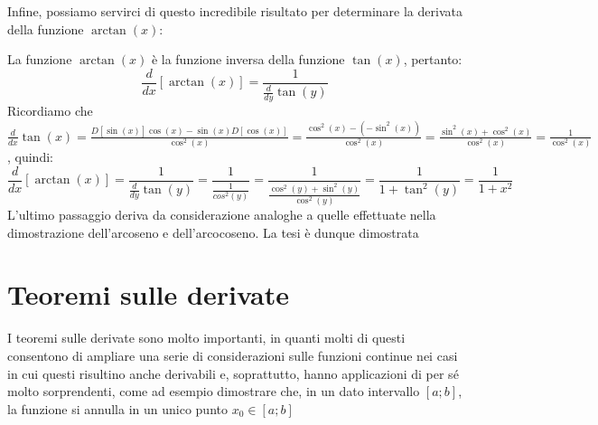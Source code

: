 \documentclass{report}
\begin{document}
Infine, possiamo servirci di questo incredibile risultato per determinare la derivata della funzione $\arctan(x)$:
\begin{myproof}
La funzione $\arctan(x)$ è la funzione inversa della funzione $\tan(x)$, pertanto:
$$
	\frac{d}{dx}[\arctan(x)] = \frac{1}{\frac{d}{dy} \tan(y)}
$$
Ricordiamo che $\frac{d}{dx} \tan(x) = \frac{D[\sin(x)]\cos(x) - \sin(x)D[\cos(x)]}{\cos^2(x)} = \frac{\cos^2(x) - (-\sin^2(x))}{\cos^2(x)} = \frac{\sin^2(x) + \cos^2(x)}{\cos^2(x)} = \frac{1}{\cos^2(x)}$, quindi:
$$
	\frac{d}{dx}[\arctan(x)] = \frac{1}{\frac{d}{dy} \tan(y)} = \frac{1}{\frac{1}{cos^2(y)}} = \frac{1}{\frac{\cos^2(y) + \sin^2(y)}{\cos^2(y)}} = \frac{1}{1 + \tan^2(y)} = \frac{1}{1+x^2}
$$
L'ultimo passaggio deriva da considerazione analoghe a quelle effettuate nella dimostrazione dell'arcoseno e dell'arcocoseno. La tesi è dunque dimostrata
\end{myproof}
\chapter{Teoremi sulle derivate}
I teoremi sulle derivate sono molto importanti, in quanti molti di questi consentono di ampliare una serie di considerazioni sulle funzioni continue nei casi in cui questi risultino anche derivabili e, soprattutto, hanno applicazioni di per sé molto sorprendenti, come ad esempio dimostrare che, in un dato intervallo $[a;b]$, la funzione si annulla in un unico punto $x_0 \in [a;b]$ 
\end{document}
